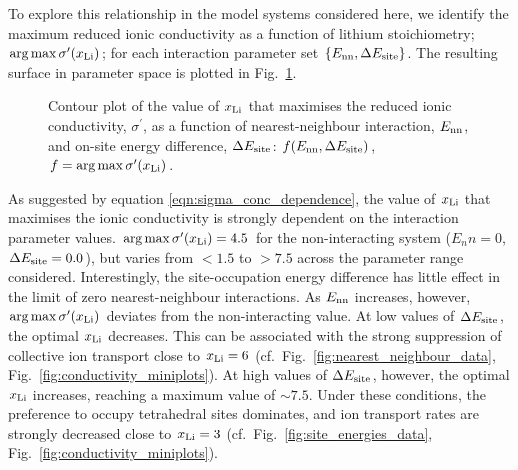 \documentclass[aps,prb,twocolumn,superscriptaddress,reprint]{revtex4-1}
\newcommand{\set}[1]{\left\{#1\right\}}
\newcommand{\xLi}{x_\m{Li}}
\begin{document}
To explore this relationship in the model systems considered here, we identify the maximum reduced ionic conductivity as a function of lithium stoichiometry; $\arg\max \sigma^\prime(\xLi)$; for each interaction parameter set $\set{E_\m{nn}, \Delta E_\m{site}}$. The resulting surface in parameter space is plotted in Fig.\ \ref{fig:max_sigma}.
\begin{figure}[tb]
  \centering
    \caption{\label{fig:max_sigma}Contour plot of the value of $\xLi$ that maximises the reduced ionic conductivity, $\sigma^\prime$, as a function of nearest-neighbour interaction, $E_{\mathrm{nn}}$, and on-site energy difference, $\Delta E_{\mathrm{site}}$: $f(E_{\mathrm{nn}}, \Delta E_{\mathrm{site}})$, $f = \arg \max \sigma^\prime(\xLi)$.}
\end{figure}
As suggested by equation \ref{eqn:sigma_conc_dependence}, the value of $\xLi$ that maximises the ionic conductivity is strongly dependent on the interaction parameter values. $\arg \max \sigma^\prime(\xLi)=4.5$ for the non-interacting system ($E_nn=0$, $\Delta E_{\mathrm{site}}=0.0$), but varies from $<1.5$ to $>7.5$ across the parameter range considered. Interestingly, the site-occupation energy difference has little effect in the limit of zero nearest-neighbour interactions. As $E_{\mathrm{nn}}$ increases, however, $\arg \max \sigma^\prime(\xLi)$ deviates from the non-interacting value. At low values of $\Delta E_{\mathrm{site}}$, the optimal $\xLi$ decreases. This can be associated with the strong suppression of collective ion transport close to $\xLi=6$ (cf.\ Fig.~\ref{fig:nearest_neighbour_data}, Fig.~\ref{fig:conductivity_miniplots}). At high values of $\Delta E_{\mathrm{site}}$, however, the optimal $\xLi$ increases, reaching a maximum value of $\sim7.5$. Under these conditions, the preference to occupy tetrahedral sites dominates, and ion transport rates are strongly decreased close to $\xLi=3$ (cf.\ Fig.~\ref{fig:site_energies_data}, Fig.~\ref{fig:conductivity_miniplots}).
\end{document}
